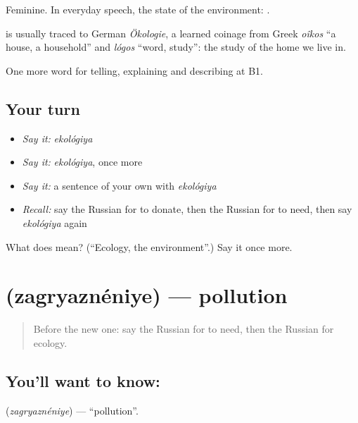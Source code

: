 Feminine. In everyday speech, the state of the environment: \emph{ }.

\begin{cousinweb}
\textbf{} is usually traced to German \emph{Ökologie}, a learned coinage from Greek \emph{oîkos} \textquotedblleft{}a house, a household\textquotedblright{} and \emph{lógos} \textquotedblleft{}word, study\textquotedblright{}: the study of the home we live in.
\end{cousinweb}

\begin{grammarlens}[title={What you've built}]
One more word for telling, explaining and describing at B1.
\end{grammarlens}

\subsection*{Your turn}
\begin{itemize}
\raggedright
  \item \emph{Say it:} \emph{ekológiya}
  \item \emph{Say it:} \emph{ekológiya}, once more
  \item \emph{Say it:} a sentence of your own with \emph{ekológiya}
  \item \emph{Recall:} say the Russian for to donate, then the Russian for to need, then say \emph{ekológiya} again
\end{itemize}

\begin{tcolorbox}[breakable,colback=teal!4,colframe=teal!35!black,title={Before you move on}]
What does  mean? (\textquotedblleft{}Ecology, the environment\textquotedblright{}.) Say it once more.
\end{tcolorbox}
\section[\texorpdfstring{\ru{загрязнение} (zagryaznéniye)}{загрязнение (zagryaznéniye)}]{ (zagryaznéniye) — pollution}

\label{lesson:RU-C369-zagryaznenie}



\begin{quote}
Before the new one: say the Russian for to need, then the Russian for ecology.
\end{quote}

\subsection*{You'll want to know: }
\textbf{} (\emph{zagryaznéniye}) — \textquotedblleft{}pollution\textquotedblright{}.

